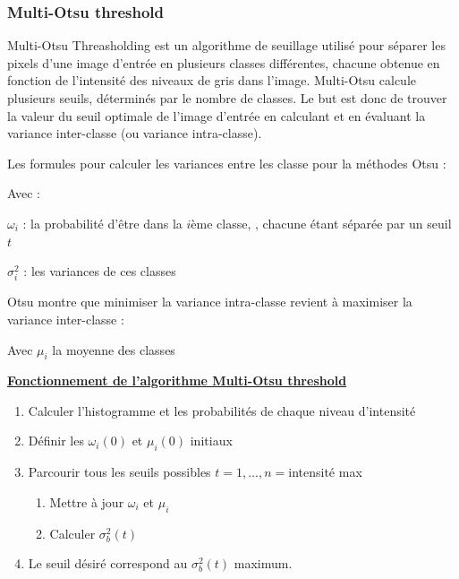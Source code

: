 \documentclass[12pt, openany]{report}
\begin{document}
\subsubsection{Multi-Otsu threshold}
Multi-Otsu Threasholding \cite{otsu} est un algorithme de seuillage utilisé pour séparer les pixels d'une image d'entrée en plusieurs classes différentes, chacune obtenue en fonction de l'intensité des niveaux de gris dans l'image.
Multi-Otsu calcule plusieurs seuils, déterminés par le nombre de classes. Le but est donc de trouver la valeur du seuil optimale de l'image d'entrée en calculant et en évaluant la variance inter-classe (ou variance intra-classe).

Les formules pour calculer les variances entre les classe pour la méthodes Otsu :

Avec : 
\begin{mylist}
\item $\omega_i$ : la probabilité d'être dans la $i$ème classe, , chacune étant séparée par un seuil $t$
\item $\sigma_i^2$ : les variances de ces classes
\end{mylist}

Otsu montre que minimiser la variance intra-classe revient à maximiser la variance inter-classe : 

Avec $\mu_i$ la moyenne des classes

\textbf{\underline{Fonctionnement de l’algorithme Multi-Otsu threshold}}

\begin{enumerate}
    \item Calculer l'histogramme et les probabilités de chaque niveau d'intensité
    \item Définir les $\omega_i(0)$  et $\mu_i(0)$ initiaux
    \item Parcourir tous les seuils possibles $t=1,\ldots,n=$intensité max
    \begin{enumerate}
        \item Mettre à jour $\omega_{i}$ et  $\mu_{i}$
        \item Calculer $\sigma_{b}^{2}(t)$
    \end{enumerate}
    \item Le seuil désiré correspond au $\sigma_{b}^{2}(t)$ maximum.
\end{enumerate}
\end{document}
